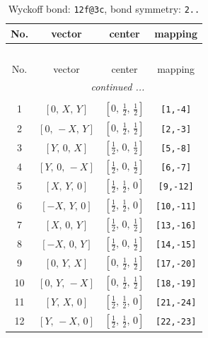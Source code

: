 \documentclass[fleqn,8pt]{jsarticle}
\begin{document}
\renewcommand{\arraystretch}{1.2}
\begin{longtable}{cccc}
\caption{Wyckoff bond: {\tt 12f@3c}, bond symmetry: {\tt 2..}}
 \\
 \hline \hline
No. & vector & center & mapping \\ \hline \endfirsthead

\multicolumn{3}{l}{\tablename\ \thetable{}} \\
 \hline \hline
No. & vector & center & mapping \\ \hline \endhead

 \hline \hline
\multicolumn{3}{r}{\footnotesize\it continued ...} \\ \endfoot

 \hline \hline
\multicolumn{3}{r}{} \\ \endlastfoot

1 & $\left[ 0,\, X,\, Y \right]$ & $\left[ 0,\, \frac{1}{2},\, \frac{1}{2} \right]$ & {\tt [1,-4]} \\ \hline
2 & $\left[ 0,\, - X,\, Y \right]$ & $\left[ 0,\, \frac{1}{2},\, \frac{1}{2} \right]$ & {\tt [2,-3]} \\ \hline
3 & $\left[ Y,\, 0,\, X \right]$ & $\left[ \frac{1}{2},\, 0,\, \frac{1}{2} \right]$ & {\tt [5,-8]} \\ \hline
4 & $\left[ Y,\, 0,\, - X \right]$ & $\left[ \frac{1}{2},\, 0,\, \frac{1}{2} \right]$ & {\tt [6,-7]} \\ \hline
5 & $\left[ X,\, Y,\, 0 \right]$ & $\left[ \frac{1}{2},\, \frac{1}{2},\, 0 \right]$ & {\tt [9,-12]} \\ \hline
6 & $\left[ - X,\, Y,\, 0 \right]$ & $\left[ \frac{1}{2},\, \frac{1}{2},\, 0 \right]$ & {\tt [10,-11]} \\ \hline
7 & $\left[ X,\, 0,\, Y \right]$ & $\left[ \frac{1}{2},\, 0,\, \frac{1}{2} \right]$ & {\tt [13,-16]} \\ \hline
8 & $\left[ - X,\, 0,\, Y \right]$ & $\left[ \frac{1}{2},\, 0,\, \frac{1}{2} \right]$ & {\tt [14,-15]} \\ \hline
9 & $\left[ 0,\, Y,\, X \right]$ & $\left[ 0,\, \frac{1}{2},\, \frac{1}{2} \right]$ & {\tt [17,-20]} \\ \hline
10 & $\left[ 0,\, Y,\, - X \right]$ & $\left[ 0,\, \frac{1}{2},\, \frac{1}{2} \right]$ & {\tt [18,-19]} \\ \hline
11 & $\left[ Y,\, X,\, 0 \right]$ & $\left[ \frac{1}{2},\, \frac{1}{2},\, 0 \right]$ & {\tt [21,-24]} \\ \hline
12 & $\left[ Y,\, - X,\, 0 \right]$ & $\left[ \frac{1}{2},\, \frac{1}{2},\, 0 \right]$ & {\tt [22,-23]} \\
\end{longtable}
\end{document}

